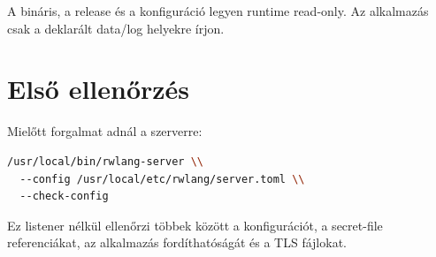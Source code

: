 A bináris, a release és a konfiguráció legyen runtime read-only. Az alkalmazás csak a deklarált data/log helyekre írjon.

\section{Első ellenőrzés}

Mielőtt forgalmat adnál a szerverre:

\begin{lstlisting}[language=bash]
/usr/local/bin/rwlang-server \\
  --config /usr/local/etc/rwlang/server.toml \\
  --check-config
\end{lstlisting}

Ez listener nélkül ellenőrzi többek között a konfigurációt, a secret-file referenciákat, az alkalmazás fordíthatóságát és a TLS fájlokat.
